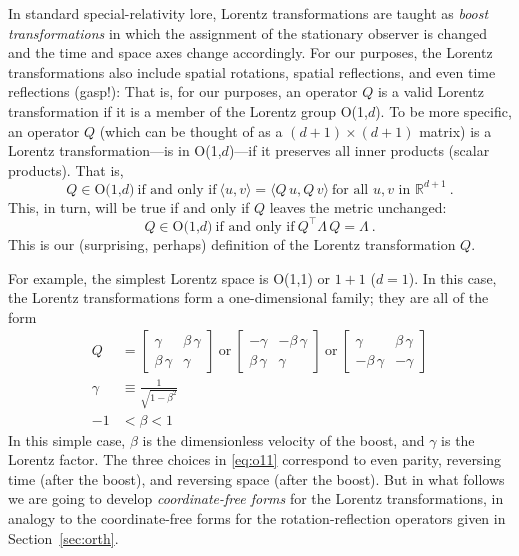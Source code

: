 \documentclass{article}
\newcommand{\inner}[2]{\langle{#1},{#2}\rangle}
\newcommand{\secref}[1]{Section~\ref{#1}}
\begin{document}
In standard special-relativity lore, Lorentz transformations are taught as \emph{boost transformations} in which the assignment of the stationary observer is changed and the time and space axes change accordingly.
For our purposes, the Lorentz transformations also include spatial rotations, spatial reflections, and even time reflections (gasp!):
That is, for our purposes, an operator $Q$ is a valid Lorentz transformation if it is a member of the Lorentz group O(1,$d$).
To be more specific, an operator $Q$ (which can be thought of as a $(d+1)\times(d+1)$ matrix) is a Lorentz transformation---is in O(1,$d$)---if it preserves all inner products (scalar products). 
That is,
\begin{equation}
    Q \in \mbox{O(1,$d$)} ~ \mbox{if and only if} ~ \inner{u}{v}=\inner{Q\,u}{Q\,v} ~ \mbox{for all $u,v$ in $\mathbb{R}^{d+1}$} ~ .
\end{equation}
This, in turn, will be true if and only if $Q$ leaves the metric unchanged:
\begin{equation}
    Q \in \mbox{O(1,$d$)} ~ \mbox{if and only if} ~ Q^\top\Lambda\,Q=\Lambda ~ .
\end{equation}
This is our (surprising, perhaps) definition of the Lorentz transformation $Q$.

For example, the simplest Lorentz space is O(1,1) or $1+1$ ($d=1$).
In this case, the Lorentz transformations form a one-dimensional family; they are all of the form
\begin{align}
    Q &= \begin{bmatrix}\gamma & \beta\,\gamma \\ \beta\,\gamma & \gamma\end{bmatrix} ~\mbox{or}~
    \begin{bmatrix}-\gamma & -\beta\,\gamma \\ \beta\,\gamma & \gamma\end{bmatrix} ~\mbox{or}~
    \begin{bmatrix}\gamma & \beta\,\gamma \\ -\beta\,\gamma & -\gamma\end{bmatrix} \label{eq:o11}
    \\
    \gamma &\equiv \frac{1}{\sqrt{1 - \beta^2}}
    \\
    -1 &< \beta < 1
\end{align}
In this simple case, $\beta$ is the dimensionless velocity of the boost, and $\gamma$ is the Lorentz factor.
The three choices in \eqref{eq:o11} correspond to even parity, reversing time (after the boost), and reversing space (after the boost).
But in what follows we are going to develop \emph{coordinate-free forms} for the Lorentz transformations, in analogy to the coordinate-free forms for the rotation-reflection operators given in \secref{sec:orth}.
\end{document}
